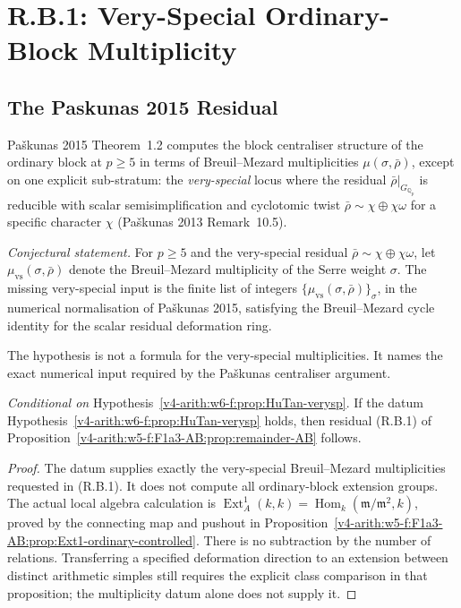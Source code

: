 \section{R.B.1: Very-Special Ordinary-Block Multiplicity}
\label{v4-arith:w6-f:R-B-1}

\subsection{The Paskunas 2015 Residual}

Pa\v skunas 2015 Theorem~1.2 computes the block
centraliser structure of the ordinary block at \(p\geq 5\) in terms of
Breuil--Mezard multiplicities \(\mu(\sigma,\bar\rho)\), except on one
explicit sub-stratum: the \emph{very-special} locus where the residual
\(\bar\rho|_{G_{\mathbb{Q}_{p}}}\) is reducible with scalar
semisimplification and cyclotomic twist \(\bar\rho\sim\chi\oplus\chi\omega\)
for a specific character \(\chi\) (Pa\v skunas 2013
Remark~10.5).

\begin{hypothesis}
\label{v4-arith:w6-f:prop:HuTan-verysp}
\emph{Conjectural statement.} For \(p\geq 5\) and the very-special
residual \(\bar\rho\sim\chi\oplus\chi\omega\), let
\(\mu_{\mathrm{vs}}(\sigma,\bar\rho)\) denote the Breuil--Mezard
multiplicity of the Serre weight \(\sigma\). The missing
very-special input is the finite list of integers
\(\{\mu_{\mathrm{vs}}(\sigma,\bar\rho)\}_{\sigma}\), in the numerical
normalisation of Pa\v skunas 2015, satisfying the Breuil--Mezard cycle
identity for the scalar residual deformation ring.
\end{hypothesis}

\begin{remark}
The hypothesis is not a formula for the very-special multiplicities.
It names the exact numerical input required by the Pa\v skunas
centraliser argument.
\end{remark}

\begin{corollary}
\label{v4-arith:w6-f:cor:R-B-1-closed}
\emph{Conditional on}
Hypothesis~\ref{v4-arith:w6-f:prop:HuTan-verysp}. If the datum
Hypothesis~\ref{v4-arith:w6-f:prop:HuTan-verysp} holds, then residual (R.B.1)
of Proposition~\ref{v4-arith:w5-f:F1a3-AB:prop:remainder-AB} follows.
\end{corollary}

\begin{proof}
The datum supplies exactly the very-special Breuil--Mezard
multiplicities requested in (R.B.1). It does not compute all ordinary-block
extension groups. The actual local algebra calculation is
\(\operatorname{Ext}^1_A(k,k)=
\operatorname{Hom}_k(\mathfrak m/\mathfrak m^2,k)\), proved by the
connecting map and pushout in
Proposition~\ref{v4-arith:w5-f:F1a3-AB:prop:Ext1-ordinary-controlled}.
There is no subtraction by the number of relations. Transferring a
specified deformation direction to an extension between distinct
arithmetic simples still requires the explicit class comparison in
that proposition; the multiplicity datum alone does not supply it.
\end{proof}

